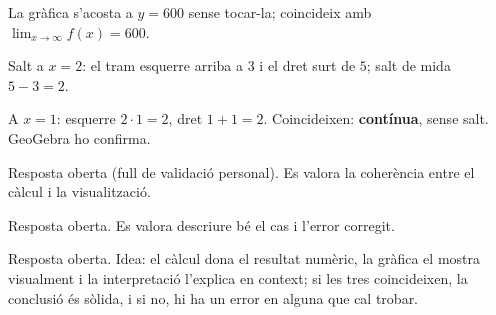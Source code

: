 \begin{solucions}
\begin{sollist}
  \item La gràfica s'acosta a $y=600$ sense tocar-la; coincideix amb
        $\lim_{x\to\infty}f(x)=600$.
  \item Salt a $x=2$: el tram esquerre arriba a $3$ i el dret surt de $5$; salt de mida
        $5-3=2$.
  \item A $x=1$: esquerre $2\cdot 1=2$, dret $1+1=2$. Coincideixen: \textbf{contínua},
        sense salt. GeoGebra ho confirma.
  \item Resposta oberta (full de validació personal). Es valora la coherència entre el
        càlcul i la visualització.
  \item Resposta oberta. Es valora descriure bé el cas i l'error corregit.
  \item Resposta oberta. Idea: el càlcul dona el resultat numèric, la gràfica el mostra
        visualment i la interpretació l'explica en context; si les tres coincideixen, la
        conclusió és sòlida, i si no, hi ha un error en alguna que cal trobar.
\end{sollist}
\end{solucions}
